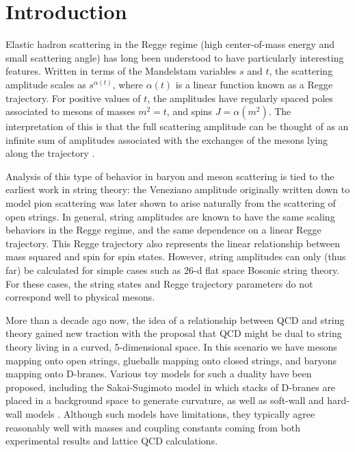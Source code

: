 \documentclass[aps, prd, preprintnumbers, floatfix, showpacs, showkeys, nofootinbib, 10pt]{revtex4-1}
\begin{document}
\maketitle


\section{Introduction}

Elastic hadron scattering in the Regge regime (high center-of-mass energy and small scattering angle) has long been understood to have particularly interesting features.  Written in terms of the Mandelstam variables $s$ and $t$, the scattering amplitude scales as $s^{\alpha(t)}$, where $\alpha(t)$ is a linear function known as a Regge trajectory.  For positive values of $t$, the amplitudes have regularly spaced poles associated to mesons of masses $m^2 = t$, and spins $J =   \alpha(m^2)$.  The interpretation of this is that the full scattering amplitude can be thought of as an infinite sum of amplitudes associated with the exchanges of the mesons lying along the trajectory \cite{earlyRegge}.

Analysis of this type of behavior in baryon and meson scattering is tied to the earliest work in string theory: the Veneziano amplitude originally written down to model pion scattering was later shown to arise naturally from the scattering of open strings.  In general, string amplitudes are known to have the same scaling behaviors in the Regge regime, and the same dependence on a linear Regge trajectory.  This Regge trajectory also represents the linear relationship between mass squared and spin for spin states.  However, string amplitudes can only (thus far) be calculated for simple cases such as 26-d flat space Bosonic string theory.  For these cases, the string states and Regge trajectory parameters do not correspond well to physical mesons.

More than a decade ago now, the idea of a relationship between QCD and string theory gained new traction with the proposal that QCD might be dual to string theory living in a curved, 5-dimensional space.  In this scenario we have mesons mapping onto open strings, glueballs mapping onto closed strings, and baryons mapping onto D-branes.  Various toy models for such a duality have been proposed, including the Sakai-Sugimoto model in which stacks of D-branes are placed in a background space to generate curvature, as well as soft-wall and hard-wall models \cite{Sakai:2004cn}.  Although such models have limitations, they typically agree reasonably well with masses and coupling constants coming from both experimental results and lattice QCD calculations.  
\end{document}
